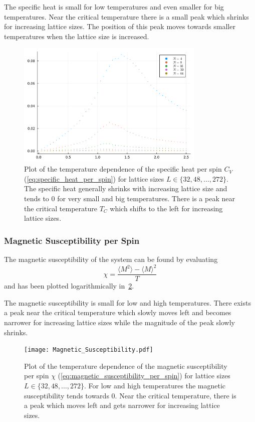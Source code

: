 The specific heat is small for low temperatures and even smaller for big temperatures. Near the critical temperature there is a small peak which shrinks for increasing lattice sizes. The position of this peak moves towards smaller temperatures when the lattice size is increased. 
\begin{figure}[!htb]
	\centering
	\includegraphics[width=0.8\textwidth]{Specific_Heat.pdf}
	\caption[Temperature dependence of the specifc heat per spin $C_V$]{Plot of the temperature dependence of the specific heat per spin $C_V$ (\cref{eq:specific_heat_per_spin}) for lattice sizes $L\in\{32, 48, \dots, 272\}$. The specific heat generally shrinks with increasing lattice size and tends to $0$ for very small and big temperatures. There is a peak near the critical temperature $T_C$ which shifts to the left for increasing lattice sizes.}
	\label{fig:specific_heat}
\end{figure}

\subsubsection{Magnetic Susceptibility per Spin}\label{sec:magnetic_susceptibility_per_spin}
The magnetic susceptibility of the system can be found by evaluating
\begin{equation}\label{eq:magnetic_susceptibility_per_spin}
	\chi = \frac{\langle M^2 \rangle - {\langle M \rangle}^2}{T}
\end{equation}
and has been plotted logarithmically in~\cref{fig:magnetic_susceptibility}.

The magnetic susceptibility is small for low and high temperatures. There exists a peak near the critical temperature which slowly moves left and becomes narrower for increasing lattice sizes while the magnitude of the peak slowly shrinks.
\begin{figure}[!htb]
	\centering
	\texttt{[image: Magnetic\_Susceptibility.pdf]}
	\caption[Temperature dependence of the mangetic susceptibility per spin $\chi$]{Plot of the temperature dependence of the magnetic susceptibility per spin $\chi$ (\cref{eq:magnetic_susceptibility_per_spin}) for lattice sizes $L\in\{32, 48, \dots, 272\}$. For low and high temperatures the magnetic susceptibility tends towards $0$. Near the critical temperature, there is a peak which moves left and gets narrower for increasing lattice sizes.}
	\label{fig:magnetic_susceptibility}
\end{figure}

